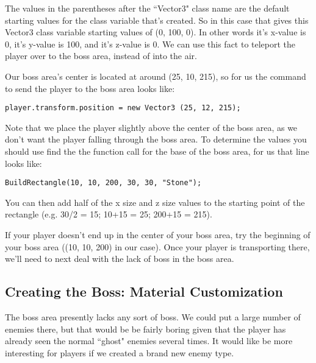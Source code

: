 \documentclass{article}
\begin{document}
The values in the parentheses after the ``Vector3" class name are the default starting values for the class variable that's created. So in this case that gives this Vector3 class variable starting values of (0, 100, 0). In other words it's x-value is 0, it's y-value is 100, and it's z-value is 0. We can use this fact to teleport the player over to the boss area, instead of into the air. 

Our boss area's center is located at around (25, 10, 215), so for us the command to send the player to the boss area looks like: 

\lstset{style=sharpc}
\begin{lstlisting}
player.transform.position = new Vector3 (25, 12, 215);
\end{lstlisting} 

Note that we place the player slightly above the center of the boss area, as we don't want the player falling through the boss area. To determine the values you should use find the the function call for the base of the boss area, for us that line looks like: 

\lstset{style=sharpc}
\begin{lstlisting}
BuildRectangle(10, 10, 200, 30, 30, "Stone");
\end{lstlisting} 

You can then add half of the x size and z size values to the starting point of the rectangle (e.g. 30/2 = 15; 10+15 = 25; 200+15 = 215). 

\noindent{}

If your player doesn't end up in the center of your boss area, try the beginning of your boss area ((10, 10, 200) in our case). Once your player is transporting there, we'll need to next deal with the lack of boss in the boss area.

\subsection{Creating the Boss: Material Customization}

The boss area presently lacks any sort of boss. We could put a large number of enemies there, but that would be be fairly boring given that the player has already seen the normal ``ghost" enemies several times. It would like be more interesting for players if we created a brand new enemy type. 
\end{document}
